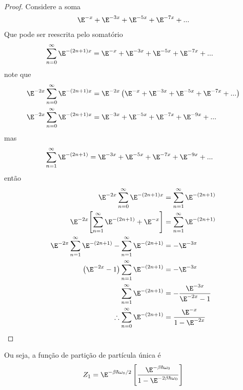 \begin{prob}
\begin{sol}
\begin{enumerate}[label=\alph *)]
\begin{align}
      \end{align}
      \begin{proof}
        Considere a soma
        \begin{align}
          \E^{-x}+\E^{-3x}+\E^{-5x}+\E^{-7x}+...
        \end{align}
        Que pode ser reescrita pelo somatório
        \begin{align}
          \sum_{n=0}^\infty\E^{-(2n+1)x}&=\E^{-x}+\E^{-3x}+\E^{-5x}+\E^{-7x}+...
        \end{align}
        note que
        \begin{align}
          \begin{split}
            \E^{-2x}\sum_{n=0}^\infty\E^{-(2n+1)x}&=\E^{-2x}\left(\E^{-x}+\E^{-3x}+\E^{-5x}+\E^{-7x}+...\right)\\
            \E^{-2x}\sum_{n=0}^\infty\E^{-(2n+1)x}&=\E^{-3x}+\E^{-5x}+\E^{-7x}+\E^{-9x}+...
          \end{split}
        \end{align}
        mas
        \begin{align}
          \sum_{n=1}^\infty\E^{-(2n+1)}&=\E^{-3x}+\E^{-5x}+\E^{-7x}+\E^{-9x}+...
        \end{align}
        então
        \begin{align}
          \begin{split}
            \E^{-2x}\sum_{n=0}^\infty\E^{-(2n+1)x}&=\sum_{n=1}^\infty\E^{-(2n+1)}\\
            \E^{-2x}\Biggl[\sum_{n=1}^\infty\E^{-(2n+1)}+\E^{-x}\Biggr]&=\sum_{n=1}^\infty\E^{-(2n+1)}\\
            \E^{-2x}\sum_{n=1}^\infty\E^{-(2n+1)}-\sum_{n=1}^\infty\E^{-(2n+1)}&=-\E^{-3x}\\
            \left(\E^{-2x}-1\right)\sum_{n=1}^\infty\E^{-(2n+1)}&=-\E^{-3x}\\
            \sum_{n=1}^\infty\E^{-(2n+1)}&=-\frac{\E^{-3x}}{\E^{-2x}-1}\\
            \therefore
            \sum_{n=0}^\infty\E^{-(2n+1)}&=\frac{\E^{-x}}{1-\E^{-2x}}
          \end{split}
        \end{align}
      \end{proof}
      Ou seja, a função de partição de partícula única é
      \begin{align}
        \begin{split}
          Z_1&=\E^{-\beta\hbar\omega_0/2}\left[\frac{\E^{-\beta\hbar\omega_0}}{1-\E^{-2\beta\hbar\omega_0}}\right]\\

\end{split}
\end{align}
\end{enumerate}
\end{sol}
\end{prob}
